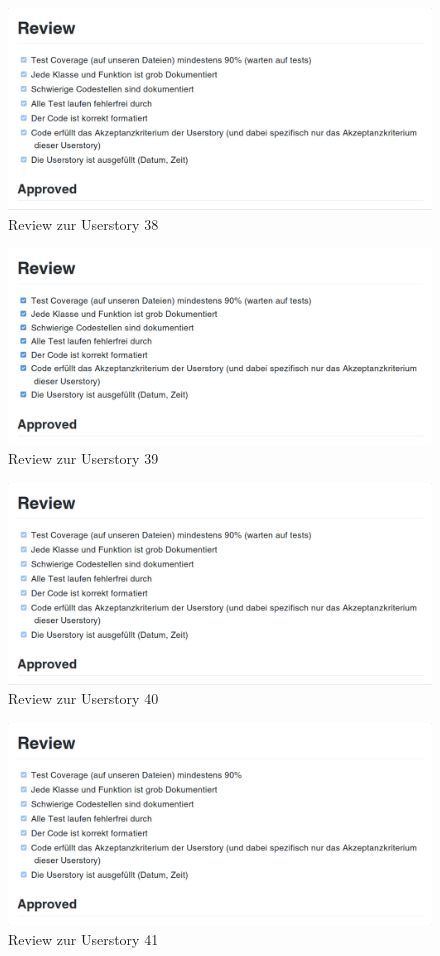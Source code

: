 \documentclass[accentcolor=tud9c,12pt,paper=a4]{tudreport}
\begin{document}
\begin{figure}[H]
\centering
\includegraphics[width=.8\textwidth]{code_review/us38}
\caption{Review zur Userstory 38}
\end{figure}

\begin{figure}[H]
\centering
\includegraphics[width=.8\textwidth]{code_review/us39}
\caption{Review zur Userstory 39}
\end{figure}

\begin{figure}[H]
\centering
\includegraphics[width=.8\textwidth]{code_review/us40}
\caption{Review zur Userstory 40}
\end{figure}

\begin{figure}[H]
\centering
\includegraphics[width=.8\textwidth]{code_review/us41}
\caption{Review zur Userstory 41}
\end{figure}
\end{document}
